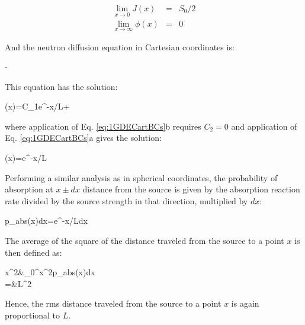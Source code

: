 \begin{subequations}
\label{eq:1GDECartBCs}
\begin{eqnarray}
\lim_{x\rightarrow0}J(x)&=&S_0/2\\
\lim_{x\rightarrow\infty}\phi(x)&=&0
\end{eqnarray}
\end{subequations}

And the neutron diffusion equation in Cartesian coordinates is:

\beq
{}-
\eeq

This equation has the solution:

\beq
\phi(x)=C_1e^{-x/L}+
\eeq

where application of Eq. \eqref{eq:1GDECartBCs}b requires \(C_2=0\) and application of Eq. \eqref{eq:1GDECartBCs}a gives the solution:

\beq
\phi(x)=e^{-x/L}
\eeq

Performing a similar analysis as in spherical coordinates, the probability of absorption at \(x\pm dx\) distance from the source is given by the absorption reaction rate divided by the source strength in that direction, multiplied by \(dx\):

\beq
p_{abs}(x)dx=e^{-x/L}dx
\eeq

The average of the square of the distance traveled from the source to a point \(x\) is then defined as:

\beqa
\langle x^2\rangle\equiv&\int_0^\infty x^2p_{abs}(x)dx\\
=&L^2
\eeqa

Hence, the \gls{rms} distance traveled from the source to a point \(x\) is again proportional to \(L\).

